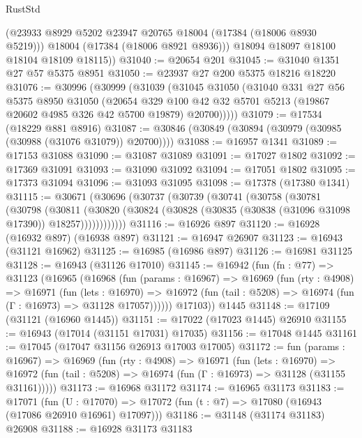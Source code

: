 \begin{lexlean}{RustStd}
\begin{coremodule}
          (@23933 @8929 @5202 @23947 @20765 @18004 (@17384 (@18006 @8930 @5219)))
          @18004
          (@17384 (@18006 @8921 @8936)))
        @18094
        @18097
        @18100
        @18104
        @18109
        @18115))
@31040 := @20654 @201
@31045 := @31040 @1351 @27 @57 @5375 @8951
@31050 := @23937 @27 @200 @5375 @18216 @18220
@31076 := @30996
    (@30999
      (@31039
        (@31045
          @31050
          (@31040
            @331
            @27
            @56
            @5375
            @8950
            @31050
            (@20654
              @329
              @100
              @42
              @32
              @5701
              @5213
              (@19867 @20602 @4985 @326 @42 @5700 @19879)
              @20700)))))
@31079 := @17534 (@18229 @881 @8916)
@31087 := @30846 (@30849 (@30894 (@30979 (@30985 (@30988 (@31076 @31079)) @20700))))
@31088 := @16957 @1341
@31089 := @17153 @31088
@31090 := @31087 @31089
@31091 := @17027 @1802
@31092 := @17369 @31091
@31093 := @31090 @31092
@31094 := @17051 @1802
@31095 := @17373 @31094
@31096 := @31093 @31095
@31098 := @17378 (@17380 @1341)
@31115 := @30671
    (@30696
      (@30737
        (@30739
          (@30741
            (@30758
              (@30781
                (@30798
                  (@30811
                    (@30820
                      (@30824 (@30828 (@30835 (@30838 (@31096 @31098 @17390)) @18257))))))))))))
@31116 := @16926 @897
@31120 := @16928 (@16932 @897) (@16938 @897)
@31121 := @16947 @26907
@31123 := @16943 (@31121 @16962)
@31125 := @16985 (@16986 @897)
@31126 := @16981 @31125
@31128 := @16943 (@31126 @17010)
@31145 := @16942
    (fun (fn : @77) =>
    @31123
      (@16965
        (@16968
          (fun (params : @16967) =>
          @16969
            (fun (rty : @4908) =>
            @16971
              (fun (lets : @16970) =>
              @16972 (fun (tail : @5208) => @16974 (fun (Γ : @16973) => @31128 @17057))))))
        @17103))
    @1445
@31148 := @17109 (@31121 (@16960 @1445))
@31151 := @17022 (@17023 @1445) @26910
@31155 := @16943 (@17014 (@31151 @17031) @17035)
@31156 := @17048 @1445
@31161 := @17045 (@17047 @31156 @26913 @17003 @17005)
@31172 := fun (params : @16967) =>
  @16969
    (fun (rty : @4908) =>
    @16971
      (fun (lets : @16970) =>
      @16972 (fun (tail : @5208) => @16974 (fun (Γ : @16973) => @31128 (@31155 @31161)))))
@31173 := @16968 @31172
@31174 := @16965 @31173
@31183 := @17071
    (fun (U : @17070) => @17072 (fun (t : @7) => @17080 (@16943 (@17086 @26910 @16961) @17097)))
@31186 := @31148 (@31174 @31183) @26908
@31188 := @16928 @31173 @31183

\end{coremodule}
\end{lexlean}
